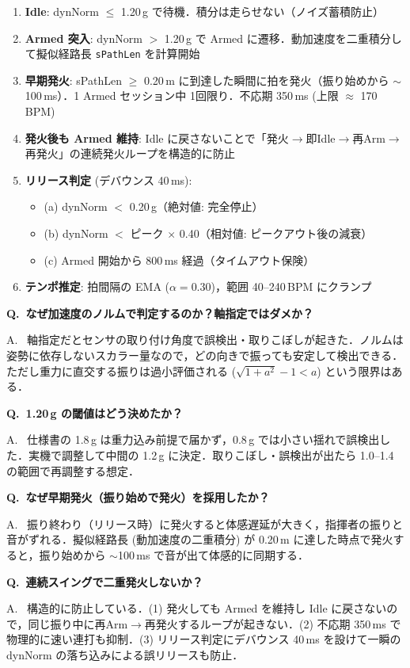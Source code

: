 \documentclass[uplatex,dvipdfmx,a4paper,10pt]{jsarticle}
\newcommand{\QA}[2]{%
  \par\noindent\textbf{\textcolor{qcolor}{Q.~#1}}%
  \par\noindent\textcolor{acolor}{A.~#2}\medskip%
}
\begin{document}
\begin{enumerate}
  \item \textbf{Idle}: dynNorm $\leq$ 1.20\,g で待機．積分は走らせない（ノイズ蓄積防止）
  \item \textbf{Armed 突入}: dynNorm $>$ 1.20\,g で Armed に遷移．動加速度を二重積分して擬似経路長 \texttt{sPathLen} を計算開始
  \item \textbf{早期発火}: sPathLen $\geq$ 0.20\,m に到達した瞬間に拍を発火（振り始めから $\sim$100\,ms）．1 Armed セッション中 1回限り．不応期 350\,ms (上限 $\approx$ 170\,BPM)
  \item \textbf{発火後も Armed 維持}: Idle に戻さないことで「発火$\to$即Idle$\to$再Arm$\to$再発火」の連続発火ループを構造的に防止
  \item \textbf{リリース判定} (デバウンス 40\,ms):
    \begin{itemize}
      \item (a) dynNorm $<$ 0.20\,g（絶対値: 完全停止）
      \item (b) dynNorm $<$ ピーク $\times$ 0.40（相対値: ピークアウト後の減衰）
      \item (c) Armed 開始から 800\,ms 経過（タイムアウト保険）
    \end{itemize}
  \item \textbf{テンポ推定}: 拍間隔の EMA ($\alpha = 0.30$)，範囲 40--240\,BPM にクランプ
\end{enumerate}

\QA{なぜ加速度のノルムで判定するのか？軸指定ではダメか？}{
軸指定だとセンサの取り付け角度で誤検出・取りこぼしが起きた．ノルムは姿勢に依存しないスカラー量なので，どの向きで振っても安定して検出できる．ただし重力に直交する振りは過小評価される ($\sqrt{1+a^2}-1 < a$) という限界はある．}

\QA{1.20\,g の閾値はどう決めたか？}{
仕様書の 1.8\,g は重力込み前提で届かず，0.8\,g では小さい揺れで誤検出した．実機で調整して中間の 1.2\,g に決定．取りこぼし・誤検出が出たら 1.0--1.4 の範囲で再調整する想定．}

\QA{なぜ早期発火（振り始めで発火）を採用したか？}{
振り終わり（リリース時）に発火すると体感遅延が大きく，指揮者の振りと音がずれる．擬似経路長 (動加速度の二重積分) が 0.20\,m に達した時点で発火すると，振り始めから $\sim$100\,ms で音が出て体感的に同期する．}

\QA{連続スイングで二重発火しないか？}{
構造的に防止している．(1) 発火しても Armed を維持し Idle に戻さないので，同じ振り中に再Arm$\to$再発火するループが起きない．(2) 不応期 350\,ms で物理的に速い連打も抑制．(3) リリース判定にデバウンス 40\,ms を設けて一瞬の dynNorm の落ち込みによる誤リリースも防止．}
\end{document}
